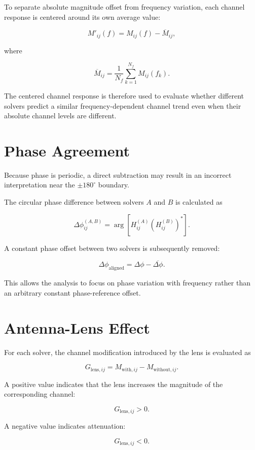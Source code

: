 \documentclass[11pt,a4paper]{article}
\begin{document}
To separate absolute magnitude offset from frequency variation, each channel response is centered around its own average value:

\[
M'_{ij}(f)
=
M_{ij}(f)
-
\overline{M}_{ij},
\]

where

\[
\overline{M}_{ij}
=
\frac{1}{N_f}
\sum_{k=1}^{N_f}
M_{ij}(f_k).
\]

The centered channel response is therefore used to evaluate whether different solvers predict a similar frequency-dependent channel trend even when their absolute channel levels are different.

\section{Phase Agreement}

Because phase is periodic, a direct subtraction may result in an incorrect interpretation near the $\pm180^\circ$ boundary.

The circular phase difference between solvers $A$ and $B$ is calculated as

\[
\Delta\phi_{ij}^{(A,B)}
=
\arg
\left[
H_{ij}^{(A)}
\left(
H_{ij}^{(B)}
\right)^*
\right].
\]

A constant phase offset between two solvers is subsequently removed:

\[
\Delta\phi_{\mathrm{aligned}}
=
\Delta\phi
-
\overline{\Delta\phi}.
\]

This allows the analysis to focus on phase variation with frequency rather than an arbitrary constant phase-reference offset.

\section{Antenna-Lens Effect}

For each solver, the channel modification introduced by the lens is evaluated as

\[
G_{\mathrm{lens},ij}
=
M_{\mathrm{with},ij}
-
M_{\mathrm{without},ij}.
\]

A positive value indicates that the lens increases the magnitude of the corresponding channel:

\[
G_{\mathrm{lens},ij}>0.
\]

A negative value indicates attenuation:

\[
G_{\mathrm{lens},ij}<0.
\]
\end{document}

